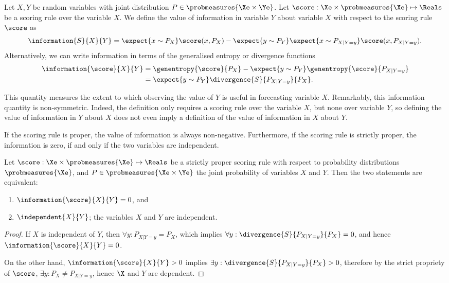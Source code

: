 \begin{definition}
	\label{def:value_of_information}
	Let $X,Y$ be random variables with joint distribution $P\in\probmeasures{\Xe\times\Ye}$. Let $\score:\Xe\times\probmeasures{\Xe}\mapsto\Reals$ be a scoring rule over the variable $X$. We define the value of information in variable $Y$ about variable $X$ with respect to the scoring rule $\score$ as
	\begin{equation}
		\information{S}{X}{Y} =  \expect{x\sim P_{X}}\score(x,P_{X})- \expect{y\sim P_{Y}} \expect{x\sim P_{X\vert Y=y}}\score(x,P_{X\vert Y=y}).
	\end{equation}
	Alternatively, we can write information in terms of the generalised entropy or divergence functions
		\begin{align}
			\information{\score}{X}{Y} &=  \genentropy{\score}{P_{X}} - \expect{y \sim P_{Y}} \genentropy{\score}{P_{X\vert Y=y}}\\
				&= \expect{y\sim P_{Y}}\divergence{S}{P_{X\vert Y=y}}{P_{X}}.
		\end{align}
\end{definition}

This quantity measures the extent to which observing the value of $Y$ is useful in forecasting variable $X$. Remarkably, this information quantity is non-symmetric. Indeed, the definition only requires a scoring rule over the variable $X$, but none over variable $Y$, so defining the value of information in $Y$ about $X$ does not even imply a definition of the value of information in $X$ about $Y$.

If the scoring rule is proper, the value of information is always non-negative. Furthermore, if the scoring rule is strictly proper, the information is zero, if and only if the two variables are independent.

\begin{theorem}
	Let $\score:\Xe\times\probmeasures{\Xe}\mapsto\Reals$ be a strictly proper scoring rule with respect to probability distributions $\probmeasures{\Xe}$, and $P\in\probmeasures{\Xe\times\Ye}$ the joint probability of variables $X$ and $Y$. Then the two statements are equivalent:
	\begin{enumerate}
		\item $\information{\score}{X}{Y} = 0$, and
		\item $\independent{X}{Y}$; the variables $X$ and $Y$ are independent.
	\end{enumerate}
	\begin{proof}
		If $X$ is independent of $Y$, then $\forall y: P_{X\vert Y=y} = P_{X}$, which implies $\forall y:  \divergence{S}{P_{X\vert Y=y}}{P_{X}}=0$, and hence $\information{\score}{X}{Y} = 0$.
		
		On the other hand, $\information{\score}{X}{Y} > 0$ implies $\exists y: \divergence{S}{P_{X\vert Y=y}}{P_{X}} > 0$, therefore by the strict propriety of $\score$, $\exists y: P_X \neq P_{X\vert Y=y}$, hence $\X$ and $Y$ are dependent.
	\end{proof}
\end{theorem}

